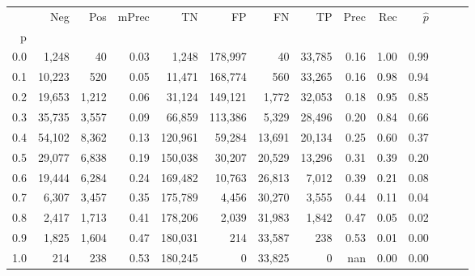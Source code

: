 \begin{tabular}{rrrrrrrrrrrrrr}
\toprule
{} &     Neg &    Pos & mPrec &       TN &       FP &      FN &      TP &  Prec &   Rec & $\hat{p}$ \\
p   &         &        &       &          &          &         &         &       &       &           \\
\midrule
0.0 &   1,248 &     40 &  0.03 &    1,248 &  178,997 &      40 &  33,785 &  0.16 &  1.00 &      0.99 \\
0.1 &  10,223 &    520 &  0.05 &   11,471 &  168,774 &     560 &  33,265 &  0.16 &  0.98 &      0.94 \\
0.2 &  19,653 &  1,212 &  0.06 &   31,124 &  149,121 &   1,772 &  32,053 &  0.18 &  0.95 &      0.85 \\
0.3 &  35,735 &  3,557 &  0.09 &   66,859 &  113,386 &   5,329 &  28,496 &  0.20 &  0.84 &      0.66 \\
0.4 &  54,102 &  8,362 &  0.13 &  120,961 &   59,284 &  13,691 &  20,134 &  0.25 &  0.60 &      0.37 \\
0.5 &  29,077 &  6,838 &  0.19 &  150,038 &   30,207 &  20,529 &  13,296 &  0.31 &  0.39 &      0.20 \\
0.6 &  19,444 &  6,284 &  0.24 &  169,482 &   10,763 &  26,813 &   7,012 &  0.39 &  0.21 &      0.08 \\
0.7 &   6,307 &  3,457 &  0.35 &  175,789 &    4,456 &  30,270 &   3,555 &  0.44 &  0.11 &      0.04 \\
0.8 &   2,417 &  1,713 &  0.41 &  178,206 &    2,039 &  31,983 &   1,842 &  0.47 &  0.05 &      0.02 \\
0.9 &   1,825 &  1,604 &  0.47 &  180,031 &      214 &  33,587 &     238 &  0.53 &  0.01 &      0.00 \\
1.0 &     214 &    238 &  0.53 &  180,245 &        0 &  33,825 &       0 &   nan &  0.00 &      0.00 \\
\bottomrule
\end{tabular}
